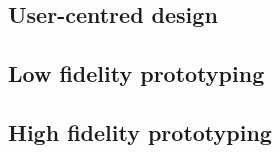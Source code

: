 \subsection{User-centred design}\label{subsec:user-centred-design}


\cite{lu2011pubmed, hearst2007biotext}



\cite{bolchini2009better, pavelin2012bioinformatics}


\subsection{Low fidelity prototyping}\label{subsec:low-fidelity-prototype}

\cite{egger2000lofi}



\subsection{High fidelity prototyping}\label{subsec:high-fidelity-prototype}


